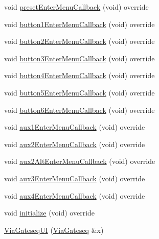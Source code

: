 \begin{DoxyCompactItemize}
void \mbox{\hyperlink{class_via_gateseq_1_1_via_gateseq_u_i_af0d1fcd037084b122f68ea1522080fd7}{preset\+Enter\+Menu\+Callback}} (void) override
\item 
void \mbox{\hyperlink{class_via_gateseq_1_1_via_gateseq_u_i_aa4ce0e46aeda7bea4ec2a09bbca2abac}{button1\+Enter\+Menu\+Callback}} (void) override
\item 
void \mbox{\hyperlink{class_via_gateseq_1_1_via_gateseq_u_i_ae0e3038febadb4cde08ff0f3da2703fe}{button2\+Enter\+Menu\+Callback}} (void) override
\item 
void \mbox{\hyperlink{class_via_gateseq_1_1_via_gateseq_u_i_a634b6fe2c13f90490b6e8182b4854425}{button3\+Enter\+Menu\+Callback}} (void) override
\item 
void \mbox{\hyperlink{class_via_gateseq_1_1_via_gateseq_u_i_a2f739b43b005baf5bc8dd4d081c5b6d5}{button4\+Enter\+Menu\+Callback}} (void) override
\item 
void \mbox{\hyperlink{class_via_gateseq_1_1_via_gateseq_u_i_a6286441705681c57d4f8535d0445b360}{button5\+Enter\+Menu\+Callback}} (void) override
\item 
void \mbox{\hyperlink{class_via_gateseq_1_1_via_gateseq_u_i_adf289572ed287fdc4c9ff4029f008b7b}{button6\+Enter\+Menu\+Callback}} (void) override
\item 
void \mbox{\hyperlink{class_via_gateseq_1_1_via_gateseq_u_i_ae1a1c7c97151e09b2e6b136f0c1efe6e}{aux1\+Enter\+Menu\+Callback}} (void) override
\item 
void \mbox{\hyperlink{class_via_gateseq_1_1_via_gateseq_u_i_a3f3270689385b4ba7449599538aafc59}{aux2\+Enter\+Menu\+Callback}} (void) override
\item 
void \mbox{\hyperlink{class_via_gateseq_1_1_via_gateseq_u_i_a39db35560b35c8fafeaabef258be61d8}{aux2\+Alt\+Enter\+Menu\+Callback}} (void) override
\item 
void \mbox{\hyperlink{class_via_gateseq_1_1_via_gateseq_u_i_a8235806bb28a40062b89b1cb9c83e3b0}{aux3\+Enter\+Menu\+Callback}} (void) override
\item 
void \mbox{\hyperlink{class_via_gateseq_1_1_via_gateseq_u_i_a78f330f4c02acb69f9c2321a8187f8dc}{aux4\+Enter\+Menu\+Callback}} (void) override
\item 
void \mbox{\hyperlink{class_via_gateseq_1_1_via_gateseq_u_i_ae59b0d739f92892cf9a0d16cd3d25bfa}{initialize}} (void) override
\item 
\mbox{\hyperlink{class_via_gateseq_1_1_via_gateseq_u_i_a907e06009edfea0251dbe3c00c84bcf6}{Via\+Gateseq\+UI}} (\mbox{\hyperlink{class_via_gateseq}{Via\+Gateseq}} \&x)
\end{DoxyCompactItemize}
